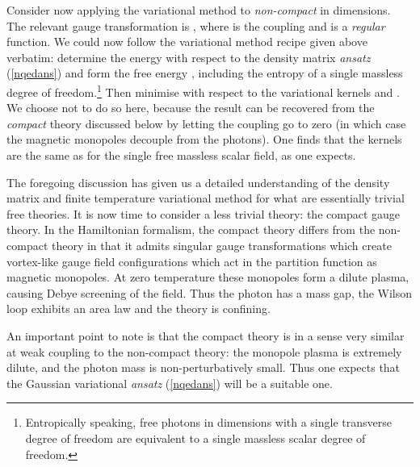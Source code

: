\documentclass[a4paper,a4paper]{article}
\begin{document}
Consider now applying the variational method to \emph{non-compact} \coordHE{} in \coordHE{} dimensions. 
The relevant \coordHE{} gauge transformation is \coordHE{},
where \coordHE{} is the coupling and \myHighlight{$\varphi$}\coordHE{} is a \emph{regular} function.
We could now follow the variational method recipe given above verbatim: 
determine the energy with respect to the density matrix \emph{ansatz} (\ref{nqedans}) and form the free energy \coordHE{},
including the entropy  of a single massless degree of freedom.\footnote{Entropically speaking, free photons in \coordHE{} dimensions
with a single transverse degree of freedom are equivalent to a single massless scalar degree of freedom.} 
Then minimise \coordHE{} with respect to the variational kernels \coordHE{} and \coordHE{}. 
We choose not to do so here, because the result can be recovered from the \emph{compact} theory discussed below by letting
the coupling go to zero (in which case the magnetic monopoles decouple from the photons).
One finds that the kernels are the same as for the single free massless scalar field, as one expects.

The foregoing discussion has given us a detailed understanding of the density matrix and finite temperature variational method
for what are essentially trivial free theories. It is now time to consider a less trivial theory: the compact \coordHE{} gauge theory.
In the Hamiltonian formalism, 
the compact theory differs from the non-compact theory in that it admits singular gauge transformations \coordHE{} 
which create vortex-like gauge field configurations
which act in the partition function as magnetic monopoles.
At zero temperature these monopoles form a dilute plasma, 
causing Debye screening of the \coordHE{} field. Thus the photon has a mass gap, 
the Wilson loop exhibits an area law and the theory is confining.

An important point to note is that the compact \coordHE{} theory is in a sense very similar at weak coupling 
to the non-compact \coordHE{} theory: the monopole plasma is extremely dilute, and the photon mass is non-perturbatively small.
Thus one expects that the Gaussian variational \emph{ansatz}
(\ref{nqedans}) will be a suitable one. 
\end{document}
